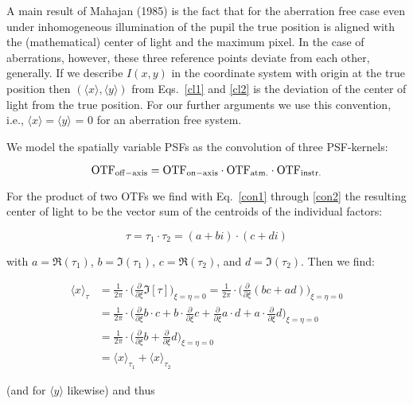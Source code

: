 A main result of Mahajan (1985) is the fact that for the aberration free case even under inhomogeneous illumination of the pupil the true position is aligned with the (mathematical) center of light and the maximum pixel. In the case of aberrations, however, these three reference points deviate from each other, generally. If we describe $I(x,y)$ in the coordinate system with origin at the true position then $(\langle x \rangle, \langle y \rangle)$ from Eqs.~\ref{cl1} and \ref{cl2} is the deviation of the center of light from the true position. For our further arguments we use this convention, i.e., $\langle x \rangle = \langle y \rangle$ = 0 for an aberration free system.

We model the spatially variable PSFs as the convolution of  three PSF-kernels:

\begin{equation}
\rm{OTF}_{\rm{off-axis}} = \rm{OTF}_{\rm{on-axis}} \cdot \rm{OTF}_{\rm{atm.}} \cdot \rm{OTF}_{\rm{instr.}}
\end{equation}

For the product of two OTFs we find with Eq.~\ref{con1} through \ref{con2} the resulting center of light to be the vector sum of the centroids of the individual factors:

\begin{equation}
\tau  = \tau_1 \cdot \tau_2 = (a + bi)\cdot (c + di)
\end{equation}

with $a = \Re(\tau_1)$, $b = \Im(\tau_1)$, $c = \Re(\tau_2)$, and $d = \Im(\tau_2)$. Then we find:

\begin{align}
\langle x \rangle_{\tau} & = \frac{1}{2\pi} \cdot \Big(\frac{\partial}{\partial\xi}\Im[\tau]\Big)_{\xi = \eta = 0} = \frac{1}{2\pi} \cdot \Big(\frac{\partial}{\partial\xi}(bc+ad)\Big)_{\xi = \eta = 0}\nonumber \\ 
& = \frac{1}{2\pi} \cdot \Big(\frac{\partial}{\partial\xi}b \cdot c + b \cdot \frac{\partial}{\partial\xi}c + \frac{\partial}{\partial\xi}a \cdot d + a \cdot \frac{\partial}{\partial\xi}d\Big)_{\xi = \eta = 0}\nonumber \\
& = \frac{1}{2\pi} \cdot \Big(\frac{\partial}{\partial\xi}b + \frac{\partial}{\partial\xi}d\Big)_{\xi = \eta = 0}\nonumber \\
& = \langle x \rangle_{\tau_1} + \langle x \rangle_{\tau_2}
\end{align}

(and for $\langle y \rangle$ likewise) and thus
 
